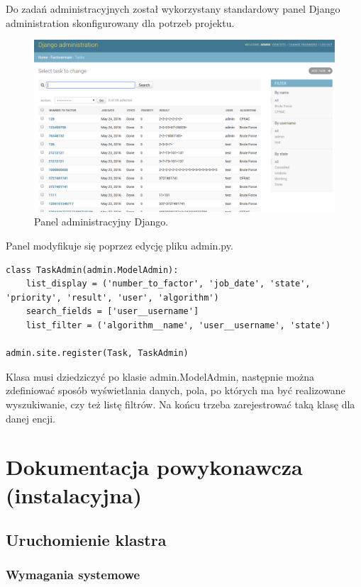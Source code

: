 \documentclass{article}
\begin{document}
Do zadań administracyjnych został wykorzystany standardowy panel Django administration skonfigurowany dla potrzeb projektu.

\begin{figure}[h!]
    \includegraphics[width=\linewidth]{adminpage.png}
    \caption{Panel administracyjny Django.}
    \label{fig:adminpagescr}
\end{figure}

Panel modyfikuje się poprzez edycję pliku admin.py.

\begin{lstlisting}
class TaskAdmin(admin.ModelAdmin):
    list_display = ('number_to_factor', 'job_date', 'state', 'priority', 'result', 'user', 'algorithm')
    search_fields = ['user__username']
    list_filter = ('algorithm__name', 'user__username', 'state')

admin.site.register(Task, TaskAdmin)
\end{lstlisting}

Klasa musi dziedziczyć po klasie admin.ModelAdmin, następnie można zdefiniować sposób wyświetlania danych, pola, po których ma być realizowane wyszukiwanie, czy też listę filtrów. Na końcu trzeba zarejestrować taką klasę dla danej encji.

\section{Dokumentacja powykonawcza (instalacyjna)}

\subsection{Uruchomienie klastra}
\subsubsection{Wymagania systemowe}
\end{document}
